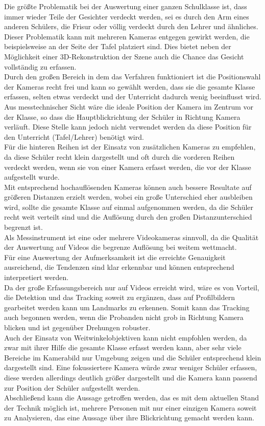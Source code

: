Die größte Problematik bei der Auswertung einer ganzen Schulklasse ist, dass immer wieder Teile der Gesichter verdeckt werden, sei es durch den Arm eines anderen Schülers, die Frisur oder völlig verdeckt durch den Lehrer und ähnliches.\\
Dieser Problematik kann mit mehreren Kameras entgegen gewirkt werden, die beispielsweise an der Seite der Tafel platziert sind. Dies bietet neben der Möglichkeit einer 3D-Rekonstruktion der Szene auch die Chance das Gesicht vollständig zu erfassen.\\
Durch den großen Bereich in dem das Verfahren funktioniert ist die Positionswahl der Kameras recht frei und kann so gewählt werden, dass sie die gesamte Klasse erfassen, selten etwas verdeckt und der Unterricht dadurch wenig beeinflusst wird. Aus messtechnischer Sicht wäre die ideale Position der Kamera im Zentrum vor der Klasse, so dass die Hauptblickrichtung der Schüler in Richtung Kamera verläuft. Diese Stelle kann jedoch nicht verwendet werden da diese Position für den Unterricht (Tafel/Lehrer) benötigt wird.\\
Für die hinteren Reihen ist der Einsatz von zusätzlichen Kameras zu empfehlen, da diese Schüler recht klein dargestellt und oft durch die vorderen Reihen verdeckt werden, wenn sie von einer Kamera erfasst werden, die vor der Klasse aufgestellt wurde.\\
Mit entsprechend hochauflösenden Kameras können auch bessere Resultate auf größeren Distanzen erzielt werden, wobei ein große Unterschied eher ausbleiben wird, sollte die gesamte Klasse auf einmal aufgenommen werden, da die Schüler recht weit verteilt sind und die Auflösung durch den großen Distanzunterschied begrenzt ist.\\ 
Als Messinstrument ist eine oder mehrere Videokameras sinnvoll, da die Qualität der Auswertung auf Videos die begrenze Auflösung bei weitem wettmacht.\\
Für eine Auswertung der Aufmerksamkeit ist die erreichte Genauigkeit ausreichend, die Tendenzen sind klar erkennbar und können entsprechend interpretiert werden.\\
Da der große Erfassungsbereich nur auf Videos erreicht wird, wäre es von Vorteil, die Detektion und das Tracking soweit zu ergänzen, dass auf Profilbildern gearbeitet werden kann um Landmarks zu erkennen. Somit kann das Tracking auch begonnen werden, wenn die Probanden nicht grob in Richtung Kamera blicken und ist gegenüber Drehungen robuster.\\
Auch der Einsatz von Weitwinkelobjektiven kann nicht empfohlen werden, da zwar mit ihrer Hilfe die gesamte Klasse erfasst werden kann, aber sehr viele Bereiche im Kamerabild nur Umgebung zeigen und die Schüler entsprechend klein dargestellt sind. Eine fokussiertere Kamera würde zwar weniger Schüler erfassen, diese werden allerdings deutlich größer dargestellt und die Kamera kann passend zur Position der Schüler aufgestellt werden.\\
Abschließend kann die Aussage getroffen werden, das es mit dem aktuellen Stand der Technik möglich ist, mehrere Personen mit nur einer einzigen Kamera soweit zu Analysieren, das eine Aussage über ihre Blickrichtung gemacht werden kann.
